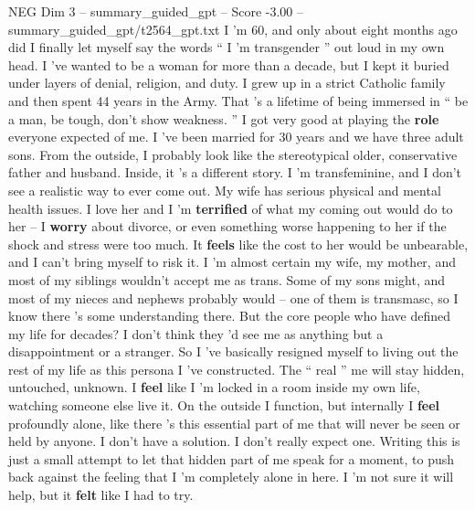 \begin{textsample}{NEG Dim 3 – summary\_guided\_gpt – Score -3.00 – summary\_guided\_gpt/t2564\_gpt.txt}  \label{ex:f3_neg_026}
I ’m 60, and only about eight months ago did I finally let myself say the words “ I ’m transgender ” out loud in my own head.
I ’ve wanted to be a woman for more than a decade, but I kept it buried under layers of denial, religion, and duty.
I grew up in a strict Catholic family and then spent 44 years in the Army.
That ’s a lifetime of being immersed in “ be a man, be tough, don't show weakness. ” I got very good at playing the \textbf{role} everyone expected of me.
I ’ve been married for 30 years and we have three adult sons.
From the outside, I probably look like the stereotypical older, conservative father and husband.
Inside, it ’s a different story.
I ’m transfeminine, and I don't see a realistic way to ever come out.
My wife has serious physical and mental health issues.
I love her and I ’m \textbf{terrified} of what my coming out would do to her – I \textbf{worry} about divorce, or even something worse happening to her if the shock and stress were too much.
It \textbf{feels} like the cost to her would be unbearable, and I can't bring myself to risk it.
I ’m almost certain my wife, my mother, and most of my siblings wouldn't accept me as trans.
Some of my sons might, and most of my nieces and nephews probably would – one of them is transmasc, so I know there ’s some understanding there.
But the core people who have defined my life for decades?
I don't think they ’d see me as anything but a disappointment or a stranger.
So I ’ve basically resigned myself to living out the rest of my life as this persona I ’ve constructed.
The “ real ” me will stay hidden, untouched, unknown.
I \textbf{feel} like I ’m locked in a room inside my own life, watching someone else live it.
On the outside I function, but internally I \textbf{feel} profoundly alone, like there ’s this essential part of me that will never be seen or held by anyone.
I don't have a solution.
I don't really expect one.
Writing this is just a small attempt to let that hidden part of me speak for a moment, to push back against the feeling that I ’m completely alone in here.
I ’m not sure it will help, but it \textbf{felt} like I had to try.

\end{textsample}
